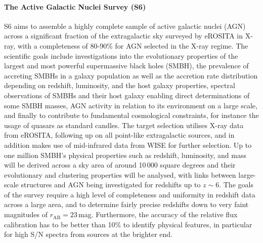 \documentclass[a4paper,11pt]{article}
\begin{document}
\paragraph{The Active Galactic Nuclei Survey (S6)}
S6 \citep{4mosts6} aims to assemble a highly complete sample of active galactic nuclei (AGN) across a significant fraction of the extragalactic sky surveyed by eROSITA in X-ray, with a completeness of 80-90\% for AGN selected in the X-ray regime. The scientific goals include investigations into the evolutionary properties of the largest and most powerful supermassive black holes (SMBH), the prevalence of accreting SMBHs in a galaxy population as well as the accretion rate distribution depending on redshift, luminosity, and the host galaxy properties, spectral observations of SMBHs and their host galaxy enabling direct determinations of some SMBH masses, AGN activity in relation to its environment on a large scale, and finally to contribute to fundamental cosmological constraints, for instance the usage of quasars as standard candles. The target selection utilises X-ray data from eROSITA, following up on all point-like extragalactic sources, and in addition makes use of mid-infrared data from WISE for further selection. Up to one million SMBH's physical properties such as redshift, luminosity, and mass will be derived across a sky area of around 10\,000 square degrees and their evolutionary and clustering properties will be analysed, with links between large-scale structures and AGN being investigated for redshifts up to $z\sim6$. The goals of the survey require a high level of completeness and uniformity in redshift data across a large area, and to determine fairly precise redshifts down to very faint magnitudes of $r_\mathrm{AB}=23$\,mag. Furthermore, the accuracy of the relative flux calibration has to be better than 10\% to identify physical features, in particular for high S/N spectra from sources at the brighter end.
%
\end{document}
